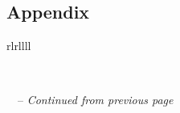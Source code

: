 \pagebreak
\begin{landscape}
\section{Appendix} \label{sec:appendix}


\begin{singlespace} 
\small


\begin{longtable}{rlrllll}
\caption{Appendix: Full FredMD variable list} \label{tab:appendix_var} \\
\endfirsthead %

%
{\tablename\ \thetable\ -- \textit{Continued from previous page}} \\
\endhead %

 \\ \endfoot
\hline
\endlastfoot


\end{longtable}
\end{singlespace}
\end{landscape}
